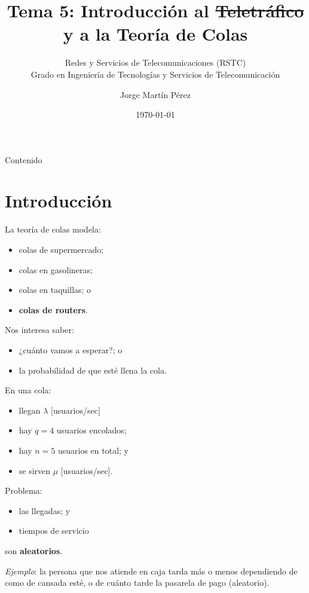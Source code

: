 \documentclass[xcolor={x11names}]{beamer}
\title[Tema 5]{Tema 5: Introducción al {\sout{Teletráfico}}\\y a la Teoría de Colas}
\subtitle{Redes y Servicios de Telecomunicaciones (RSTC)\\
Grado en Ingeniería de Tecnologías y Servicios de Telecomunicación}
\author{Jorge Martín Pérez\inst{1}}
\institute{
    \inst{1}
    Departamento de Ingeniería Telemática, Universidad Politécnica de Madrid
}
\date{\today}
\begin{document}
\frame{\titlepage}


\begin{frame}{Contenido}
    \tableofcontents
\end{frame}




\section{Introducción}
\begin{frame}{\secname}
    La teoría de colas modela:
    \begin{itemize}
        \item colas de supermercado;
        \item colas en gasolineras;
        \item colas en taquillas; o
        \item \textbf{colas de routers}.
    \end{itemize}

    \vfill
    Nos interesa saber:
    \begin{itemize}
        \item ¿cuánto vamos a esperar?; o
        \item la probabilidad de que esté llena la cola.
    \end{itemize}
\end{frame}



\begin{frame}{\secname}
    \begin{figure}
        
    \end{figure}

    En una cola:
    \begin{itemize}
        \item llegan $\lambda$ [usuarios/sec]
        \item hay $q=4$ usuarios encolados;
        \item hay $n=5$ usuarios en total; y
        \item se sirven $\mu$ [usuarios/sec].
    \end{itemize}
\end{frame}


\begin{frame}{\secname}
    Problema:
    \begin{itemize}
        \item las llegadas; y
        \item tiempos de servicio
    \end{itemize}
    son \textbf{aleatorios}.

    \vfill

    \textit{Ejemplo}: la persona que nos
    atiende en caja tarda más o menos
    dependiendo de como de cansada esté,
    o de cuánto tarde la pasarela de pago
    (aleatorio).
\end{frame}
\end{document}
